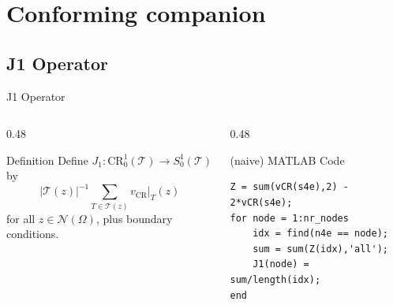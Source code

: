\documentclass{beamer}					%
\newcommand{\vCR}{v_{\mathrm{CR}}}
\begin{document}
\section{Conforming companion}
\subsection{J1 Operator}
\begin{frame}[fragile]{J1 Operator}

\begin{columns}[T]
\begin{column}{0.48\textwidth}
\begin{block}{Definition}
Define \(
J_1 : \mathrm{CR}^1_0(\mathcal{T}) \to S^1_0(\mathcal{T})\)
by
\[
|\mathcal{T}(z)|^{-1}
\sum_{T \in \mathcal{T}(z)} {\vCR|_T(z)}
\]
for all \( z \in \mathcal{N}(\Omega) \), plus boundary conditions.
\end{block}
\end{column}

\begin{column}{0.48\textwidth}

\begin{block}{(naive) MATLAB Code}
\footnotesize
\begin{verbatim}
Z = sum(vCR(s4e),2) - 2*vCR(s4e);
for node = 1:nr_nodes
    idx = find(n4e == node);
    sum = sum(Z(idx),'all');
    J1(node) = sum/length(idx);
end
\end{verbatim}
\end{block}
\end{column}
\end{columns}
\end{frame}
\end{document}
